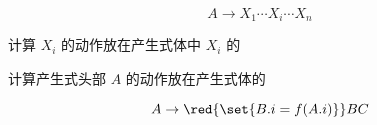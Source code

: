 \begin{frame}{}
  \begin{center}
    

    
  \end{center}
\end{frame}

\begin{frame}{}
  \begin{center}
    

    
  \end{center}
\end{frame}

\begin{frame}{}
  \begin{center}

    \[
      A \to X_{1} \cdots X_{i} \cdots X_{n}
    \]

    \vspace{0.80cm}
    计算 $X_{i}$ 的动作放在产生式体中 $X_{i}$ 的

    \vspace{0.30cm}
    计算产生式头部 $A$ 的动作放在产生式体的
  \end{center}
\end{frame}

\begin{frame}{}
  \begin{center}
    
  \end{center}
\end{frame}

\begin{frame}{}
  \begin{center}
    
  \end{center}
\end{frame}

\begin{frame}{}
  \begin{center}
    

    \vspace{0.60cm}
    \[
      A \to \red{\set{B.i = f(A.i)}} B C
    \]
    \blue{}
  \end{center}
\end{frame}

\begin{frame}{}
  \begin{center}
    
  \end{center}
\end{frame}
